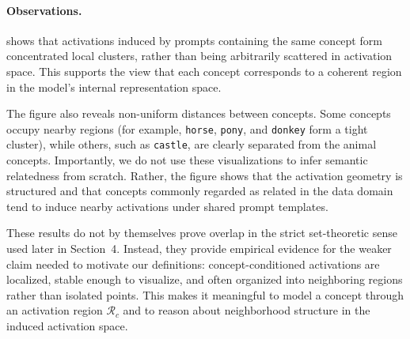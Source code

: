 \paragraph{Observations.}
 shows that activations induced by prompts containing the same concept form concentrated local clusters, rather than being arbitrarily scattered in activation space. This supports the view that each concept corresponds to a coherent region in the model's internal representation space.

The figure also reveals non-uniform distances between concepts. Some concepts occupy nearby regions (for example, \texttt{horse}, \texttt{pony}, and \texttt{donkey} form a tight cluster), while others, such as \texttt{castle}, are clearly separated from the animal concepts. Importantly, we do not use these visualizations to infer semantic relatedness from scratch. Rather, the figure shows that the activation geometry is structured and that concepts commonly regarded as related in the data domain tend to induce nearby activations under shared prompt templates.

These results do not by themselves prove overlap in the strict set-theoretic sense used later in Section~4. Instead, they provide empirical evidence for the weaker claim needed to motivate our definitions: concept-conditioned activations are localized, stable enough to visualize, and often organized into neighboring regions rather than isolated points. This makes it meaningful to model a concept through an activation region $\mathcal{R}_c$ and to reason about neighborhood structure in the induced activation space.

